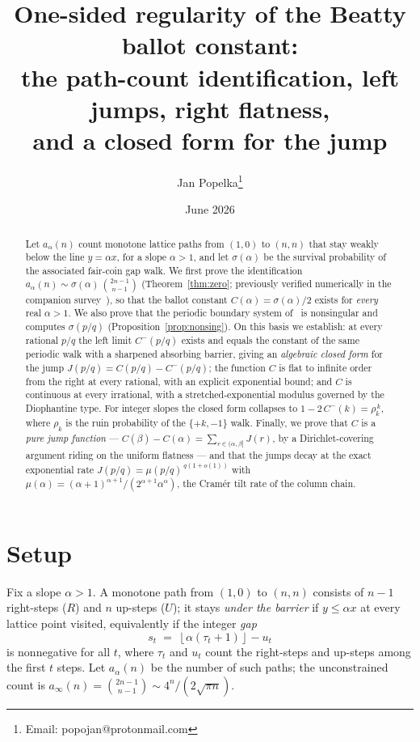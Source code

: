 \documentclass[11pt]{article}
\title{One-sided regularity of the Beatty ballot constant:\\
the path-count identification, left jumps, right flatness,\\
and a closed form for the jump}
\author{Jan Popelka\thanks{Email: popojan@protonmail.com}}
\date{June 2026}
\theoremstyle{definition}
\theoremstyle{remark}
\newcommand{\floor}[1]{\left\lfloor #1 \right\rfloor}
\begin{document}
\maketitle

\begin{abstract}
Let $a_\alpha(n)$ count monotone lattice paths from $(1,0)$ to $(n,n)$
that stay weakly below the line $y = \alpha x$, for a slope
$\alpha > 1$, and let $\sigma(\alpha)$ be the survival probability of
the associated fair-coin gap walk.
We first prove the identification
$a_\alpha(n) \sim \sigma(\alpha)\,\binom{2n-1}{n-1}$
(Theorem~\ref{thm:zero}; previously verified numerically in the
companion survey~\cite{bridge}), so that the ballot constant
$C(\alpha) = \sigma(\alpha)/2$ exists for \emph{every} real
$\alpha > 1$.
We also prove that the periodic boundary system of~\cite{bridge} is
nonsingular and computes $\sigma(p/q)$
(Proposition~\ref{prop:nonsing}).
On this basis we establish: at every rational $p/q$ the left limit
$C^-(p/q)$ exists and equals the constant of the same periodic walk
with a sharpened absorbing barrier, giving an \emph{algebraic closed
form} for the jump $J(p/q) = C(p/q) - C^-(p/q)$; the function $C$ is
flat to infinite order from the right at every rational, with an
explicit exponential bound; and $C$ is continuous at every irrational,
with a stretched-exponential modulus governed by the Diophantine type.
For integer slopes the closed form collapses to
$1 - 2\,C^-(k) = \rho_k^{\,k}$, where $\rho_k$ is the ruin probability
of the $\{+k, -1\}$ walk.
Finally, we prove that $C$ is a \emph{pure jump function} ---
$C(\beta) - C(\alpha) = \sum_{r \in (\alpha,\beta]} J(r)$, by a
Dirichlet-covering argument riding on the uniform flatness --- and
that the jumps decay at the exact exponential rate
$J(p/q) = \mu(p/q)^{\,q(1+o(1))}$ with
$\mu(\alpha) = (\alpha+1)^{\alpha+1}/(2^{\alpha+1}\alpha^{\alpha})$,
the Cram\'er tilt rate of the column chain.
\end{abstract}

\section{Setup}

Fix a slope $\alpha > 1$.
A monotone path from $(1,0)$ to $(n,n)$ consists of $n-1$ right-steps
($R$) and $n$ up-steps ($U$); it stays \emph{under the barrier} if
$y \leq \alpha x$ at every lattice point visited, equivalently if the
integer \emph{gap}
\begin{equation}\label{eq:gap}
s_t \;=\; \floor{\alpha(\tau_t + 1)} - u_t
\end{equation}
is nonnegative for all $t$, where $\tau_t$ and $u_t$ count the
right-steps and up-steps among the first $t$ steps.
Let $a_\alpha(n)$ be the number of such paths; the unconstrained count
is $a_\infty(n) = \binom{2n-1}{n-1} \sim 4^n/(2\sqrt{\pi n})$.
\end{document}
